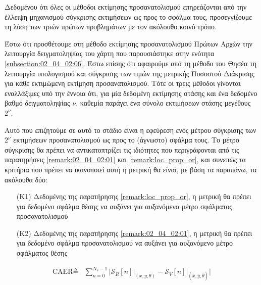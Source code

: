 Δεδομένου ότι όλες οι μέθοδοι εκτίμησης προσανατολισμού επηρεάζονται από την
έλλειψη μηχανισμού σύγκρισης εκτιμήσεων ως προς το σφάλμα τους, προσεγγίζουμε
τη λύση των τριών πρώτων προβλημάτων με τον ακόλουθο κοινό τρόπο.

Έστω ότι προσθέτουμε στη μέθοδο εκτίμησης προσανατολισμού Πρώτων Αρχών την
λειτουργία δειγματοληψίας του χάρτη που παρουσιάστηκε στην ενότητα
\ref{subsection:02_04_02:06}. Έστω επίσης ότι αφαιρούμε από τη μέθοδο του Θησέα
τη λειτουργία υπολογισμού και σύγκρισης των τιμών της μετρικής Ποσοστού
Διάκρισης για κάθε εκτιμώμενη εκτίμηση προσανατολισμού. Τότε οι τρεις μέθοδοι
γίνονται εναλλάξιμες υπό την έννοια ότι, για μία δεδομένη εκτίμησης στάσης και
ένα δεδομένο βαθμό δειγματοληψίας $\nu$, καθεμία παράγει ένα σύνολο εκτιμήσεων
στάσης μεγέθους $2^\nu$.

Αυτό που επιζητούμε σε αυτό το στάδιο είναι η εφεύρεση ενός μέτρου σύγκρισης
των $2^\nu$ εκτιμήσεων προσανατολισμού ως προς το (άγνωστο) σφάλμα τους. Το
μέτρο σύγκρισης θα πρέπει να αντικατοπτρίζει τις ιδιότητες που περιγράφονται
από τις παρατηρήσεις \ref{remark:02_04_02:01} και \ref{remark:loc_prop_or},
και συνεπώς τα κριτήρια που πρέπει να ικανοποιεί αυτή η μετρική θα είναι, με
βάση τα παραπάνω, τα ακόλουθα δύο:

\begin{itemize}
  \item[(K1)] Δεδομένης της παρατήρησης \ref{remark:loc_prop_or}, η μετρική θα πρέπει
        για δεδομένο σφάλμα θέσης να αυξάνει για αυξανόμενο μέτρο σφάλματος
        προσανατολισμού
  \item[(K2)] Δεδομένης της παρατήρησης \ref{remark:02_04_02:01}, η μετρική θα πρέπει
        για δεδομένο σφάλμα προσανατολισμού να αυξάνει για αυξανόμενο μέτρο
        σφάλματος θέσης
\end{itemize}


\begin{align}
  \text{CAER} \triangleq & \sum\limits_{n=0}^{N_s-1} \Bigg|
    \mathcal{S}_R[n]\Big|_{(x, y, \theta)} -
    \mathcal{S}_V[n]\Big|_{(\hat{x}, \hat{y}, \hat{\theta})} \Bigg|
  \label{eq:caer_normal}
\end{align}

